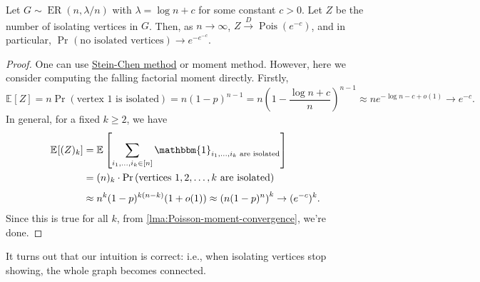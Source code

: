 \begin{theorem}\label{thm:Erdős-Rényi-isolating-vertex}
	Let \(G \sim \operatorname{ER}(n, \lambda / n)\) with \(\lambda = \log n + c\) for some constant \(c > 0\). Let \(Z\) be the number of isolating vertices in \(G\). Then, as \(n \to \infty \), \(Z \overset{D}{\to} \operatorname{Pois}(e^{-c})\), and in particular, \(\Pr_{}\left(\text{no isolated vertices} \right) \to e^{-e^{-c}}\).
\end{theorem}
\begin{proof}
	One can use \hyperref[thm:Stein-Chen-method]{Stein-Chen method} or moment method. However, here we consider computing the falling factorial moment directly. Firstly,
	\[
		\mathbb{E}_{}[Z]
		= n \Pr_{}\left(\text{vertex \(1\) is isolated} \right)
		= n (1 - p)^{n-1}
		= n \left( 1 - \frac{\log n + c}{n} \right) ^{n-1}
		\approx n e^{-\log n - c + o(1)}
		\to e^{-c}.
	\]
	In general, for a fixed \(k \geq 2\), we have
	\[
		\begin{split}
			\mathbb{E}_{}[(Z)_k]
			 & = \mathbb{E}_{}\left[\sum_{i_1, \dots , i_k \in [n]} \mathbbm{1}_{i_1, \dots , i_k \text{ are isolated} } \right] \\
			 & = (n)_k \cdot \Pr_{}\left(\text{vertices } 1, 2, \dots , k \text{ are isolated} \right)                           \\
			 & \approx n^k (1-p)^{k (n-k)} (1 + o(1))
			\approx \left( n(1-p)^n \right) ^k
			\to (e^{-c})^k.
		\end{split}
	\]
	Since this is true for all \(k\), from \autoref{lma:Poisson-moment-convergence}, we're done.
\end{proof}

It turns out that our intuition is correct: i.e., when isolating vertices stop showing, the whole graph becomes connected.

